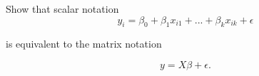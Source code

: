 \documentclass[border=3bp]{standalone}
\begin{document}
\begin{minipage}{3.5in}
Show that scalar notation
$$
y_i = \beta_0 + \beta_1 x_{i1} + ... + \beta_k x_{ik} + \epsilon
$$

is equivalent to the matrix notation

$$
y = X\beta + \epsilon.
$$
\end{minipage}
\end{document}
